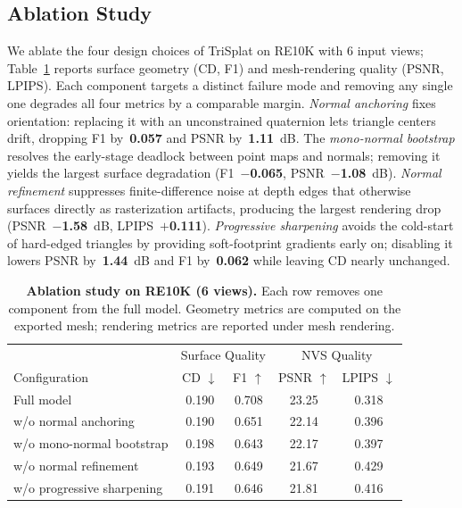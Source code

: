 \documentclass{llmxive}
\providecommand{\method}{TriSplat\xspace}
\providecommand{\arraystretch}{0.94}
\begin{document}
\subsection{Ablation Study}
\label{sec:ablation}

We ablate the four design choices of \method on RE10K with 6 input views; Table~\ref{tab:ablation} reports surface geometry (CD, F1) and mesh-rendering quality (PSNR, LPIPS). Each component targets a distinct failure mode and removing any single one degrades all four metrics by a comparable margin. \emph{Normal anchoring} fixes orientation: replacing it with an unconstrained quaternion lets triangle centers drift, dropping F1 by~\textbf{0.057} and PSNR by~\textbf{1.11}~dB. The \emph{mono-normal bootstrap} resolves the early-stage deadlock between point maps and normals; removing it yields the largest surface degradation (F1~$-$\textbf{0.065}, PSNR~$-$\textbf{1.08}~dB). \emph{Normal refinement} suppresses finite-difference noise at depth edges that otherwise surfaces directly as rasterization artifacts, producing the largest rendering drop (PSNR~$-$\textbf{1.58}~dB, LPIPS~$+$\textbf{0.111}). \emph{Progressive sharpening} avoids the cold-start of hard-edged triangles by providing soft-footprint gradients early on; disabling it lowers PSNR by~\textbf{1.44}~dB and F1 by~\textbf{0.062} while leaving CD nearly unchanged.







\begin{table}[t]
\centering
{\footnotesize
\setlength{\tabcolsep}{5.2pt}
\renewcommand{\arraystretch}{0.94}
\begin{tabular}{l|cc|cc}
\toprule
& \multicolumn{2}{c|}{Surface Quality} & \multicolumn{2}{c}{NVS Quality} \\
Configuration & CD $\downarrow$ & F1 $\uparrow$ & PSNR $\uparrow$ & LPIPS $\downarrow$ \\
\midrule
Full model                          & 0.190 & 0.708 & 23.25 & 0.318 \\
\midrule
w/o normal anchoring                & 0.190 & 0.651 & 22.14 & 0.396 \\
w/o mono-normal bootstrap           & 0.198 & 0.643 & 22.17 & 0.397 \\
w/o normal refinement               & 0.193 & 0.649 & 21.67 & 0.429 \\
w/o progressive sharpening          & 0.191 & 0.646 & 21.81 & 0.416 \\
\bottomrule
\end{tabular}
}
\caption{\textbf{Ablation study on RE10K (6 views).} Each row removes one component from the full model. Geometry metrics are computed on the exported mesh; rendering metrics are reported under mesh rendering.}
\label{tab:ablation}
\end{table}
\end{document}

